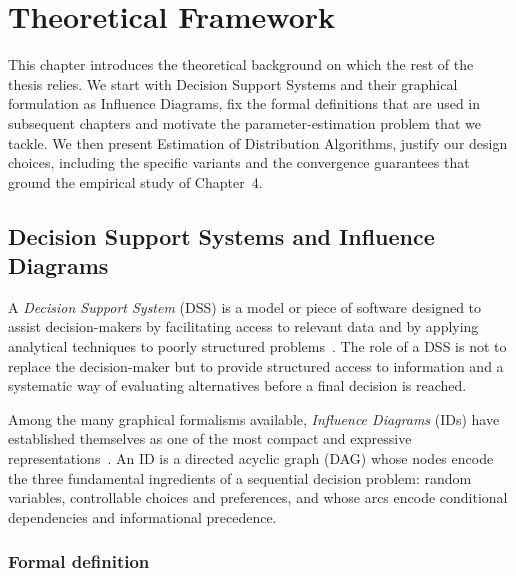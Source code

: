 
\chapter{Theoretical Framework}
\label{ch:framework}

This chapter introduces the theoretical background on which the rest of
the thesis relies. We start with Decision Support Systems and their graphical formulation as Influence Diagrams, fix the formal
definitions that are used in subsequent chapters and motivate the
parameter-estimation problem that we tackle. We then present
Estimation of Distribution Algorithms, justify our design choices, including the specific
variants and the convergence guarantees that ground the empirical study of Chapter~4.

\section{Decision Support Systems and Influence Diagrams}

A \emph{Decision Support System} (DSS) is a model or piece of
software designed to assist decision-makers by facilitating access to
relevant data and by applying analytical techniques to
poorly structured problems~\cite{insua2005,shenoy2009eolss}.
The role of a DSS is not to replace the decision-maker but to provide
structured access to information and a systematic way of evaluating
alternatives before a final decision is reached.

Among the many graphical formalisms available, \emph{Influence
Diagrams} (IDs) have established themselves as one of the most
compact and expressive
representations~\cite{howard2005influence,koller2009pgm}. An ID
is a directed acyclic graph (DAG) whose nodes encode the three fundamental
ingredients of a sequential decision problem: random variables,
controllable choices and preferences, and whose arcs encode
conditional dependencies and informational precedence.

\subsection{Formal definition}

